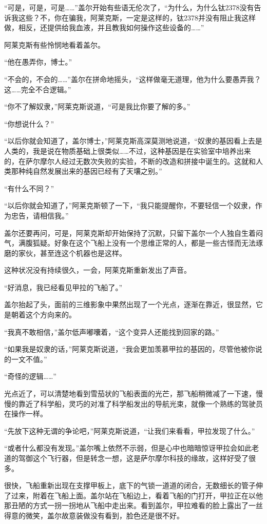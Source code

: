 “可是，可是，可是……”盖尔开始有些语无伦次了，“为什么，为什么钛2378没有告诉我这些？不，你在骗我，阿莱克斯，一定是这样的，钛2378并没有阻止我这样做，相反，还提供给我血液，并且教我如何操作这些设备的……” 

阿莱克斯有些怜悯地看着盖尔。 

“他在愚弄你，博士。” 

“不会的，不会的……”盖尔在拼命地摇头，“这样做毫无道理，他为什么要愚弄我？这……完全不合逻辑。” 

“你不了解奴隶，”阿莱克斯说道，“可是我比你要了解的多。” 

“你想说什么？” 

“以后你就会知道了，盖尔博士，”阿莱克斯高深莫测地说道，“奴隶的基因看上去是人类的，我是说在物质基础上很类似……不过，这种基因是在实验室中培养出来的，在萨尔摩尔人经过无数次失败的实验，不断的改造和拼接中诞生的。这就和人类那种纯自然发展出来的基因已经有了天壤之别。” 

“有什么不同？” 

“以后你就会知道了，”阿莱克斯顿了一下，“我只能提醒你，不要轻信一个奴隶，作为忠告，请相信我。” 

盖尔还要再问，可是，阿莱克斯却开始保持了沉默，只留下盖尔一个人独自生着闷气，满腹狐疑。好象在这个飞船上没有一个思维正常的人，都是一些古怪而无法琢磨的家伙，甚至连这个机器也是这样。 

这种状况没有持续很久，一会，阿莱克斯重新发出了声音。 

“好消息，我已经看见甲拉的飞船了。” 

盖尔抬起了头，面前的三维影象中果然出现了一个光点，逐渐在靠近，很显然，它是朝着这个方向来的。 

“我真不敢相信，”盖尔低声嘟囔着，“这个变异人还能找到回家的路。” 

“如果我是奴隶的话，”阿莱克斯说道，“我会更加羡慕甲拉的基因的，尽管他被你说的一文不值。” 

“奇怪的逻辑……” 

光点近了，可以清楚地看到雪茄状的飞船表面的光芒，那飞船稍微减了一下速，慢慢的靠近了科学船，灵巧的对准了科学船发出的导航光束，就像一个熟练的驾驶员在操作一样。 

“先放下这种无谓的争论吧，”阿莱克斯说道，“让我们来看看，甲拉发现了什么。” 

“或者什么都没有发现。”盖尔嘴上依然不示弱，但是心中也暗暗惊讶甲拉会如此老道的驾御这个飞行器，但是转念一想，这是萨尔摩尔科技的缘故，这样好受了很多。 

很快，飞船重新出现在支撑甲板上，底下的气锁一道道的闭合，无数细长的管子伸了过来，附着在飞船上面。盖尔站在飞船边上，看着飞船的门打开，甲拉正在以他那丑陋的方式一拐一拐地从飞船中走出来。看到盖尔，甲拉难看的脸上露出了一丝得意的微笑，盖尔故意装做没有看到，脸色还是很不好。 

